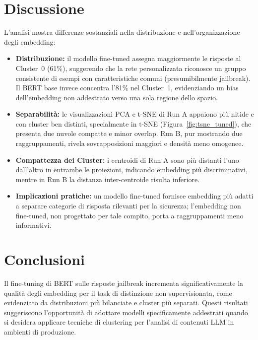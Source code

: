 \documentclass[a4paper,12pt]{article}
\begin{document}
\section{Discussione}
L'analisi mostra differenze sostanziali nella distribuzione e nell'organizzazione degli embedding:
\begin{itemize}
  \item \textbf{Distribuzione:} il modello fine-tuned assegna maggiormente le risposte al Cluster~0 (61\%), suggerendo che la rete personalizzata riconosce un gruppo consistente di esempi con caratteristiche comuni (presumibilmente jailbreak). Il BERT base invece concentra l'81\% nel Cluster~1, evidenziando un bias dell'embedding non addestrato verso una sola regione dello spazio.
  \item \textbf{Separabilità:} le visualizzazioni PCA e t-SNE di Run A appaiono più nitide e con cluster ben distinti, specialmente in t-SNE (Figura~\ref{fig:tsne_tuned}), che presenta due nuvole compatte e minor overlap. Run B, pur mostrando due raggruppamenti, rivela sovrapposizioni maggiori e densità meno omogenee.
  \item \textbf{Compattezza dei Cluster:} i centroidi di Run A sono più distanti l'uno dall'altro in entrambe le proiezioni, indicando embedding più discriminativi, mentre in Run B la distanza inter-centroide risulta inferiore.
  \item \textbf{Implicazioni pratiche:} un modello fine-tuned fornisce embedding più adatti a separare categorie di risposta rilevanti per la sicurezza; l'embedding non fine-tuned, non progettato per tale compito, porta a raggruppamenti meno informativi.
\end{itemize}

\section{Conclusioni}
Il fine-tuning di BERT sulle risposte jailbreak incrementa significativamente la qualità degli embedding per il task di distinzione non supervisionata, come evidenziato da distribuzioni più bilanciate e cluster più separati. Questi risultati suggeriscono l'opportunità di adottare modelli specificamente addestrati quando si desidera applicare tecniche di clustering per l'analisi di contenuti LLM in ambienti di produzione.
\end{document}
